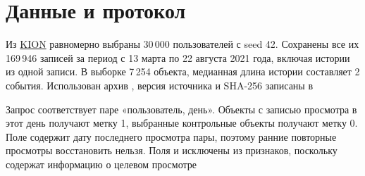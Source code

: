 \section{Данные и протокол}

Из \href{https://github.com/irsafilo/KION_DATASET}{KION} равномерно выбраны
30\,000 пользователей с seed 42. Сохранены все их 169\,946 записей за
период с 13 марта по 22 августа 2021 года, включая истории из одной записи.
В выборке 7\,254 объекта, медианная длина истории составляет 2 события.
Использован архив , версия источника и SHA-256
записаны в 

Запрос соответствует паре «пользователь, день». Объекты с записью просмотра
в этот день получают метку 1, выбранные контрольные объекты получают метку 0.
Поле  содержит дату последнего просмотра пары,
поэтому ранние повторные просмотры восстановить нельзя.
Поля  и  исключены из признаков,
поскольку содержат информацию о целевом просмотре

